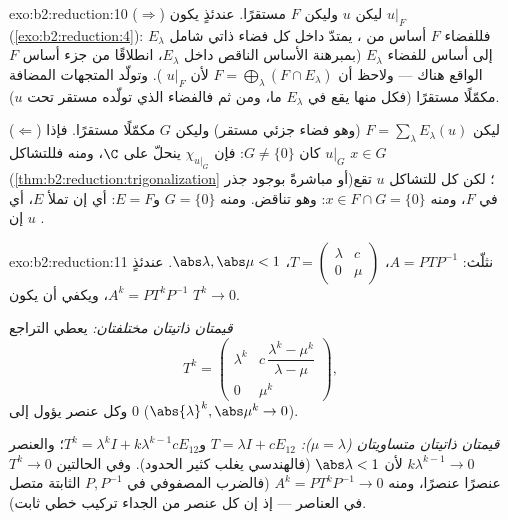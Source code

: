 \begin{solution}{exo:b2:reduction:10}
($\Rightarrow$) ليكن $u$  وليكن $F$ مستقرًا. عندئذٍ
يكون $u|_F$  (\cref{exo:b2:reduction:4}): فللفضاء $F$
أساس من ، يمتدّ داخل كل فضاء ذاتي شامل
$E_\lambda$ إلى أساس للفضاء $E_\lambda$ (بمبرهنة الأساس الناقص
داخل $E_\lambda$، انطلاقًا من جزء أساس $F$ الواقع
هناك --- ولاحظ أن $F = \bigoplus_\lambda (F \cap E_\lambda)$ لأن
$u|_F$ ). وتولّد المتجهات المضافة مكمّلًا
مستقرًا (فكل منها يقع في $E_\lambda$ ما، ومن ثم فالفضاء الذي تولّده
مستقر تحت $u$).

($\Leftarrow$) ليكن $F = \sum_\lambda E_\lambda(u)$ (وهو فضاء جزئي
مستقر) وليكن $G$ مكمّلًا مستقرًا. فإذا كان $G \neq \{0\}$: فإن $\chi_{u|_G}$
ينحلّ على $\C$، ومنه فللتشاكل $u|_G$  $x \in G$
(\cref{thm:b2:reduction:trigonalization} أو مباشرةً بوجود
جذر)؛ لكن كل  للتشاكل $u$ تقع في $F$، ومنه $x \in F
\cap G = \{0\}$: وهو تناقض. ومنه $G = \{0\}$ و$E = F$: أي إن
 تملأ $E$، أي إن $u$ .
\end{solution}

\begin{solution}{exo:b2:reduction:11}
نثلّث: $A = PTP^{-1}$، $T = \begin{pmatrix} \lambda & c\\ 0 &
\mu\end{pmatrix}$، $\abs\lambda, \abs\mu < 1$. عندئذٍ $A^k =
PT^kP^{-1}$، ويكفي أن يكون $T^k \to 0$.

\emph{قيمتان ذاتيتان مختلفتان:} يعطي التراجع
\[
T^k = \begin{pmatrix}
\lambda^k & c\,\dfrac{\lambda^k - \mu^k}{\lambda - \mu}\\[4pt]
0 & \mu^k
\end{pmatrix},
\]
وكل عنصر يؤول إلى $0$ ($\abs{\lambda}^k, \abs\mu^k \to 0$).

\emph{قيمتان ذاتيتان متساويتان ($\mu = \lambda$):} $T = \lambda I + cE_{12}$
و$T^k = \lambda^k I + k\lambda^{k-1}cE_{12}$؛ والعنصر
$k\lambda^{k-1} \to 0$ لأن $\abs\lambda < 1$ (فالهندسي يغلب
كثير الحدود). وفي الحالتين $T^k \to 0$ عنصرًا عنصرًا، ومنه $A^k =
PT^kP^{-1} \to 0$ (فالضرب المصفوفي في $P, P^{-1}$ الثابتة
متصل في العناصر --- إذ إن كل عنصر من الجداء تركيب
خطي ثابت).
\end{solution}

